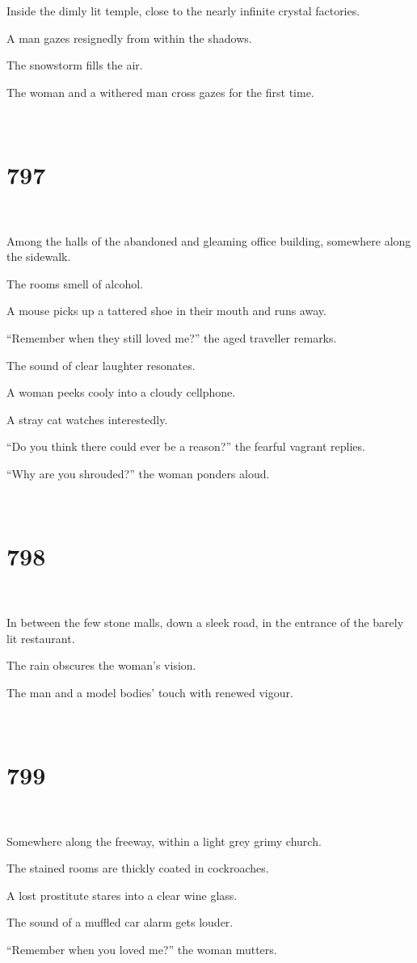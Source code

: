 \documentclass{report}
\begin{document}
Inside the dimly lit temple, close to the nearly infinite crystal factories.

A man gazes resignedly from within the shadows.

The snowstorm fills the air.

The woman and a withered man cross gazes for the first time.

~
\chapter*{797}
~

Among the halls of the abandoned and gleaming office building, somewhere along the sidewalk.

The rooms smell of alcohol.

A mouse picks up a tattered shoe in their mouth and runs away.

``Remember when they still loved me?'' the aged traveller remarks.

The sound of clear laughter resonates.

A woman peeks cooly into a cloudy cellphone.

A stray cat watches interestedly.

``Do you think there could ever be a reason?'' the fearful vagrant replies.

``Why are you shrouded?'' the woman ponders aloud.

~
\chapter*{798}
~

In between the few stone malls, down a sleek road, in the entrance of the barely lit restaurant.

The rain obscures the woman's vision.

The man and a model bodies' touch with renewed vigour.

~
\chapter*{799}
~

Somewhere along the freeway, within a light grey grimy church.

The stained rooms are thickly coated in cockroaches.

A lost prostitute stares into a clear wine glass.

The sound of a muffled car alarm gets louder.

``Remember when you loved me?'' the woman mutters.
\end{document}
